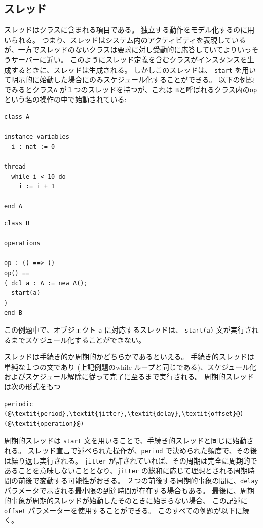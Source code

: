 \documentclass[\pformat,12pt]{jreport}
\begin{document}
\subsection{スレッド}

スレッドはクラスに含まれる項目である。
独立する動作をモデル化するのに用いられる。
つまり、スレッドはシステム内のアクティビティを表現しているが、一方でスレッドのないクラスは要求に対し受動的に応答していてよりいっそうサーバーに近い。
このようにスレッド定義を含むクラスがインスタンスを生成するときに、スレッドは生成される。
しかしこのスレッドは、 \texttt{start} を用いて明示的に始動した場合にのみスケジュール化することができる。
以下の例題でみるとクラス\texttt{A} が１つのスレッドを持つが、これは \texttt{B}と呼ばれるクラス内の\texttt{op} という名の操作の中で始動されている:

\begin{multicols}{2}
\begin{lstlisting}
class A

instance variables
  i : nat := 0

thread
  while i < 10 do
    i := i + 1

end A
\end{lstlisting}
\begin{lstlisting}
class B

operations

op : () ==> ()
op() ==
( dcl a : A := new A();
  start(a)
)
end B
\end{lstlisting}
\end{multicols}

この例題中で、オブジェクト \texttt{a} に対応するスレッドは、 \texttt{start(a)} 文が実行されるまでスケジュール化することができない。

スレッドは手続き的か周期的かどちらかであるといえる。
手続き的スレッドは単純な１つの文であり (上記例題のwhile ループと同じである)、スケジュール化およびスケジュール解除に従って完了に至るまで実行される。
周期的スレッドは次の形式をもつ

\begin{lstlisting}
periodic (@\textit{period},\textit{jitter},\textit{delay},\textit{offset}@) (@\textit{operation}@)
\end{lstlisting}

周期的スレッドは \texttt{start} 文を用いることで、手続き的スレッドと同じに始動される。
スレッド宣言で述べられた操作が、\texttt{period} で決められた頻度で、その後は繰り返し実行される。
\texttt{jitter} が許されていれば、その周期は完全に周期的であることを意味しないこととなり、\texttt{jitter} の総和に応じて理想とされる周期時間の前後で変動する可能性がおきる。
２つの前後する周期的事象の間に、\texttt{delay} パラメータで示される最小限の到達時間が存在する場合もある。
最後に、周期的事象が周期的スレッドが始動したそのときに始まらない場合、 この記述に\texttt{offset} パラメーターを使用することができる。
このすべての例題が以下に続く。
\end{document}

